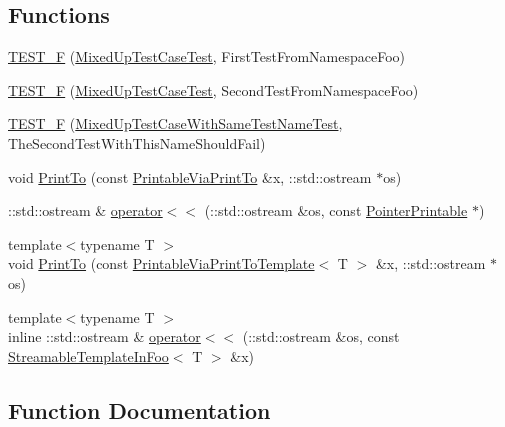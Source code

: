\subsection*{Functions}
\begin{DoxyCompactItemize}
\item 
\mbox{\hyperlink{namespacefoo_a0d50eecc97df56ae625078848ba9c98a}{T\+E\+S\+T\+\_\+F}} (\mbox{\hyperlink{classfoo_1_1MixedUpTestCaseTest}{Mixed\+Up\+Test\+Case\+Test}}, First\+Test\+From\+Namespace\+Foo)
\item 
\mbox{\hyperlink{namespacefoo_a7911fd62b6ae405016caed779b2f95dc}{T\+E\+S\+T\+\_\+F}} (\mbox{\hyperlink{classfoo_1_1MixedUpTestCaseTest}{Mixed\+Up\+Test\+Case\+Test}}, Second\+Test\+From\+Namespace\+Foo)
\item 
\mbox{\hyperlink{namespacefoo_a2bc2a2547ff38da0ecf68676e75583cd}{T\+E\+S\+T\+\_\+F}} (\mbox{\hyperlink{classfoo_1_1MixedUpTestCaseWithSameTestNameTest}{Mixed\+Up\+Test\+Case\+With\+Same\+Test\+Name\+Test}}, The\+Second\+Test\+With\+This\+Name\+Should\+Fail)
\item 
void \mbox{\hyperlink{namespacefoo_ac435de653934c97045bbdba8c8afbe3f}{Print\+To}} (const \mbox{\hyperlink{structfoo_1_1PrintableViaPrintTo}{Printable\+Via\+Print\+To}} \&x, \+::std\+::ostream $\ast$os)
\item 
\+::std\+::ostream \& \mbox{\hyperlink{namespacefoo_a65f8809f6af7f69f5cc842493caf4491}{operator$<$$<$}} (\+::std\+::ostream \&os, const \mbox{\hyperlink{structfoo_1_1PointerPrintable}{Pointer\+Printable}} $\ast$)
\item 
{\footnotesize template$<$typename T $>$ }\\void \mbox{\hyperlink{namespacefoo_a7b78eba501ea7ff1226a8cb40b6e3d92}{Print\+To}} (const \mbox{\hyperlink{classfoo_1_1PrintableViaPrintToTemplate}{Printable\+Via\+Print\+To\+Template}}$<$ T $>$ \&x, \+::std\+::ostream $\ast$os)
\item 
{\footnotesize template$<$typename T $>$ }\\inline \+::std\+::ostream \& \mbox{\hyperlink{namespacefoo_abe04f604d114085b0b9af25600ef00da}{operator$<$$<$}} (\+::std\+::ostream \&os, const \mbox{\hyperlink{classfoo_1_1StreamableTemplateInFoo}{Streamable\+Template\+In\+Foo}}$<$ T $>$ \&x)
\end{DoxyCompactItemize}


\subsection{Function Documentation}
\mbox{\label{namespacefoo_a65f8809f6af7f69f5cc842493caf4491}} 
